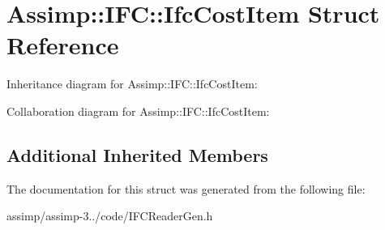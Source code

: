 \hypertarget{struct_assimp_1_1_i_f_c_1_1_ifc_cost_item}{\section{Assimp\+:\+:I\+F\+C\+:\+:Ifc\+Cost\+Item Struct Reference}
\label{struct_assimp_1_1_i_f_c_1_1_ifc_cost_item}
}


Inheritance diagram for Assimp\+:\+:I\+F\+C\+:\+:Ifc\+Cost\+Item\+:


Collaboration diagram for Assimp\+:\+:I\+F\+C\+:\+:Ifc\+Cost\+Item\+:
\subsection*{Additional Inherited Members}


The documentation for this struct was generated from the following file\+:\begin{DoxyCompactItemize}
\item 
assimp/assimp-\/3../code/I\+F\+C\+Reader\+Gen.\+h\end{DoxyCompactItemize}
